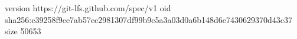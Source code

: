 version https://git-lfs.github.com/spec/v1
oid sha256:c39258f9ce7ab57ec2981307df99b9c5a3a03d0a6b148d6e7430629370d43c37
size 50653

